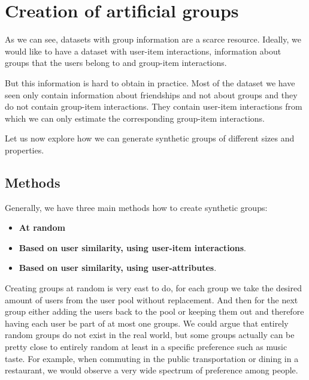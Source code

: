\section{Creation of artificial groups}

As we can see, datasets with group information are a scarce resource. Ideally, we would like to have a dataset with user-item interactions, information about groups that the users belong to and group-item interactions. 

But this information is hard to obtain in practice. Most of the dataset we have seen only contain information about friendships and not about groups and they do not contain group-item interactions. They contain user-item interactions from which we can only estimate the corresponding group-item interactions.

Let us now explore how we can generate synthetic groups of different sizes and properties.

\subsection{Methods}

Generally, we have three main methods how to create synthetic groups:
\begin{itemize}
    \item \textbf{At random}
    \item \textbf{Based on user similarity, using user-item interactions}.
    \item \textbf{Based on user similarity, using user-attributes}.
\end{itemize}

Creating groups at random is very east to do, for each group we take the desired amount of users from the user pool without replacement. And then for the next group either adding the users back to the pool or keeping them out and therefore having each user be part of at most one groups. We could argue that entirely random groups do not exist in the real world, but some groups actually can be pretty close to entirely random at least in a specific preference such as music taste. For example, when commuting in the public transportation or dining in a restaurant, we would observe a very wide spectrum of preference among people.

